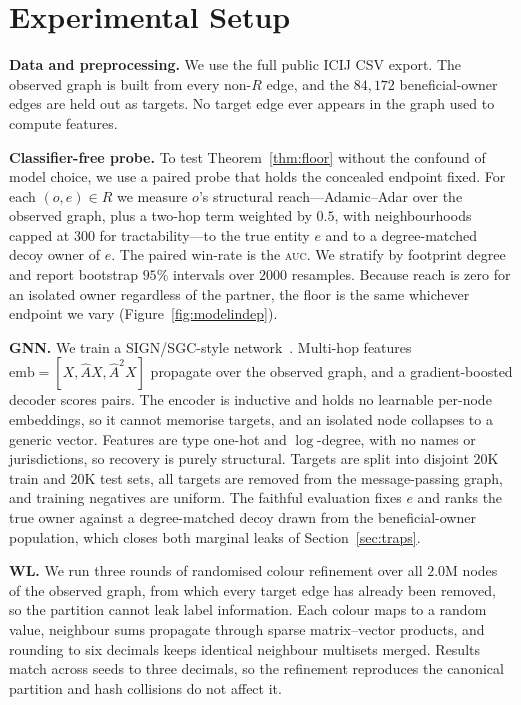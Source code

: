 \documentclass[sigconf]{acmart}
\begin{document}
\section{Experimental Setup}\label{sec:setup}
\textbf{Data and preprocessing.} We use the full public ICIJ CSV export. The
observed graph is built from every non-$R$ edge, and the $84{,}172$
beneficial-owner edges are held out as targets. No target edge ever appears in
the graph used to compute features.

\textbf{Classifier-free probe.} To test Theorem~\ref{thm:floor} without the
confound of model choice, we use a paired probe that holds the concealed endpoint
fixed. For each $(o,e)\in R$ we measure $o$'s structural reach---Adamic--Adar
over the observed graph, plus a two-hop term weighted by $0.5$, with
neighbourhoods capped at $300$ for tractability---to the true entity $e$ and to a
degree-matched decoy owner of $e$. The paired win-rate is the \textsc{auc}. We
stratify by footprint degree and report bootstrap $95\%$ intervals over $2000$
resamples. Because reach is zero for an isolated owner regardless of the partner,
the floor is the same whichever endpoint we vary (Figure~\ref{fig:modelindep}).

\textbf{GNN.} We train a SIGN/SGC-style network~\cite{sgc,sign}. Multi-hop
features $\mathrm{emb}=[X,\hat A X,\hat A^2 X]$ propagate over the observed graph,
and a gradient-boosted decoder scores pairs. The encoder is inductive and holds
no learnable per-node embeddings, so it cannot memorise targets, and an isolated
node collapses to a generic vector. Features are type one-hot and $\log$-degree,
with no names or jurisdictions, so recovery is purely structural. Targets are
split into disjoint $20$K train and $20$K test sets, all targets are removed from
the message-passing graph, and training negatives are uniform. The faithful
evaluation fixes $e$ and ranks the true owner against a degree-matched decoy drawn
from the beneficial-owner population, which closes both marginal leaks of
Section~\ref{sec:traps}.

\textbf{WL.} We run three rounds of randomised colour refinement over all
$2.0$M nodes of the observed graph, from which every target edge has already been
removed, so the partition cannot leak label information. Each colour maps to a
random value, neighbour sums propagate through
sparse matrix--vector products, and rounding to six decimals keeps identical
neighbour multisets merged. Results match across seeds to three decimals, so the
refinement reproduces the canonical partition and hash collisions do not affect
it.
\end{document}

